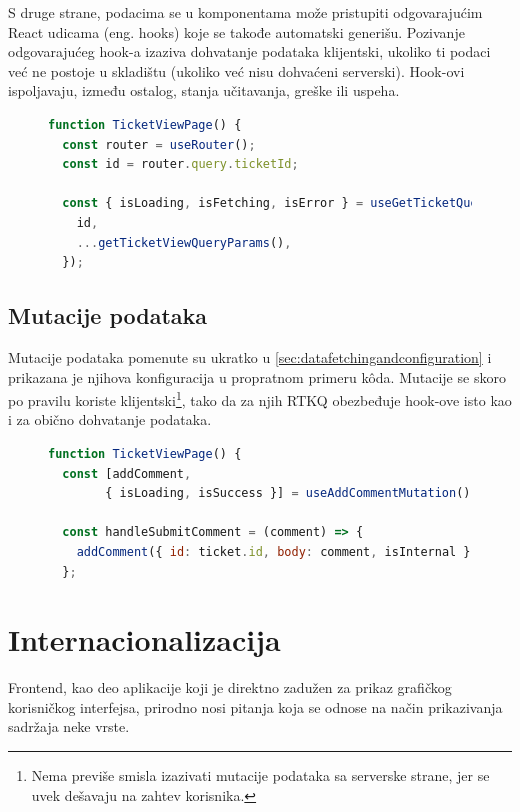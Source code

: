 \documentclass[12pt,oneside]{memoir}
\begin{document}
S druge strane, podacima se u komponentama može pristupiti odgovarajućim React udicama (eng. hooks) \cite{reactdocshooks}  koje se takođe automatski generišu. Pozivanje odgovarajućeg hook-a izaziva dohvatanje podataka klijentski, ukoliko ti podaci već ne postoje u skladištu (ukoliko već nisu dohvaćeni serverski). Hook-ovi ispoljavaju, između ostalog, stanja učitavanja, greške ili uspeha.

\begin{figure}[h]
\begin{lstlisting}[language=JavaScript, style=ES6, caption={Korišćenje RTKQ hook-ova.}]
function TicketViewPage() {
  const router = useRouter();
  const id = router.query.ticketId;

  const { isLoading, isFetching, isError } = useGetTicketQuery({
    id,
    ...getTicketViewQueryParams(),
  });
\end{lstlisting}
\end{figure}

\newpage
\subsection{Mutacije podataka}

Mutacije podataka pomenute su ukratko u \ref{sec:datafetchingandconfiguration} i prikazana je njihova konfiguracija u propratnom primeru k\^{o}da. Mutacije se skoro po pravilu koriste klijentski\footnote{Nema previše smisla izazivati mutacije podataka sa serverske strane, jer se uvek dešavaju na zahtev korisnika.}, tako da za njih RTKQ obezbeđuje hook-ove isto kao i za obično dohvatanje podataka.

\begin{figure}[h]
\begin{lstlisting}[language=JavaScript, style=ES6, caption={Korišćenje RTKQ mutacija na primeru dodavanja komentara na karticu.}]
function TicketViewPage() {
  const [addComment,
        { isLoading, isSuccess }] = useAddCommentMutation();

  const handleSubmitComment = (comment) => {
    addComment({ id: ticket.id, body: comment, isInternal });
  };
\end{lstlisting}
\end{figure}


\section{Internacionalizacija}
\label{sec:intl}

Frontend, kao deo aplikacije koji je direktno zadužen za prikaz grafičkog korisničkog interfejsa, prirodno nosi pitanja koja se odnose na način prikazivanja sadržaja neke vrste. 
\end{document}
